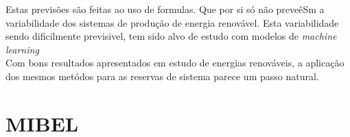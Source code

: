 Estas previsões são feitas ao uso de formulas. Que por si só não preveêSm a variabilidade dos sistemas de produção de energia renovável. Esta variabilidade sendo dificilmente previsivel, tem sido alvo de estudo com modelos de \textit{machine learning} \cite{} \\
Com bons resultados apresentados em estudo de energias renováveis, a aplicação dos mesmos metódos para as reservas de sistema parece um passo natural. \\



\section{MIBEL \label{se:mibel}}
\cite{Bessa2012}
\cite{Carneiro2016}
\cite{Fernandes2016}
\citep{Agostini2021}


